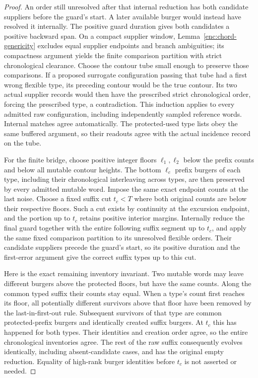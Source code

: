 \begin{proof}
An order still unresolved after that internal reduction has both
candidate suppliers before the guard's start.  A later available
burger would instead have resolved it internally.  The positive
guard duration gives both candidates a positive backward span.
On a compact supplier window, Lemma~\ref{enc:chord-genericity}
excludes equal supplier endpoints and branch ambiguities; its
compactness argument yields the finite comparison partition with
strict chronological clearance.  Choose the contour tube small
enough to preserve those comparisons.  If a proposed surrogate
configuration passing that tube had a first wrong flexible type,
its preceding contour would be the true contour.  Its two actual
supplier records would then have the prescribed strict chronological
order, forcing the prescribed type, a contradiction.  This induction
applies to every admitted raw configuration, including independently
sampled reference words.  Internal matches agree automatically.
The protected-used type lists obey the same buffered argument, so
their readouts agree with the actual incidence record on the tube.

For the finite bridge, choose positive integer floors \(\ell_1,\ell_2\)
below the prefix counts and below all mutable contour heights.
The bottom \(\ell_c\) prefix burgers of each type, including their
chronological interleaving across types, are then preserved by every
admitted mutable word.  Impose the same exact endpoint counts at the
last noise.  Choose a fixed suffix cut \(t_c<T\) where both original
counts are below their respective floors.  Such a cut exists by
continuity at the excursion endpoint, and the portion up to \(t_c\)
retains positive interior margins.  Internally reduce the final guard
together with the entire following suffix segment up to \(t_c\),
and apply the same fixed comparison partition to its unresolved
flexible orders.  Their candidate suppliers precede the guard's
start, so its positive duration and the first-error argument give
the correct suffix types up to this cut.

Here is the exact remaining inventory invariant.  Two mutable words
may leave different burgers above the protected floors, but have the
same counts.  Along the common typed suffix their counts stay equal.
When a type's count first reaches its floor, all potentially different
survivors above that floor have been removed by the last-in-first-out
rule.  Subsequent survivors of that type are common protected-prefix
burgers and identically created suffix burgers.  At \(t_c\) this has
happened for both types.  Their identities and creation order agree,
so the entire chronological inventories agree.  The rest of the raw
suffix consequently evolves identically, including absent-candidate
cases, and has the original empty reduction.  Equality of high-rank
burger identities before \(t_c\) is not asserted or needed.


\end{proof}
